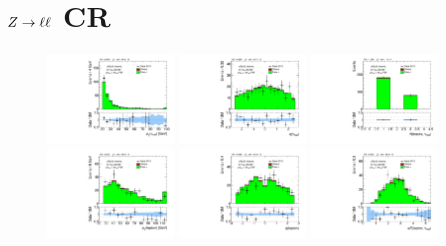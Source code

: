 \clearpage

\section{$Z \rightarrow \ell\ell$ CR}

\begin{figure}[tp]
  \centering
  \includegraphics[width=0.30\textwidth]{figures/analysis/vbf-ZllCR/tau-pt}
  \includegraphics[width=0.30\textwidth]{figures/analysis/vbf-ZllCR/tau-eta}
  \includegraphics[width=0.30\textwidth]{figures/analysis/vbf-ZllCR/tau-numTrack} \\
  \includegraphics[width=0.30\textwidth]{figures/analysis/vbf-ZllCR/lep-pt-hi}
  \includegraphics[width=0.30\textwidth]{figures/analysis/vbf-ZllCR/lep-eta}
  \includegraphics[width=0.30\textwidth]{figures/analysis/vbf-ZllCR/taulep-dR} \\

\end{figure}
